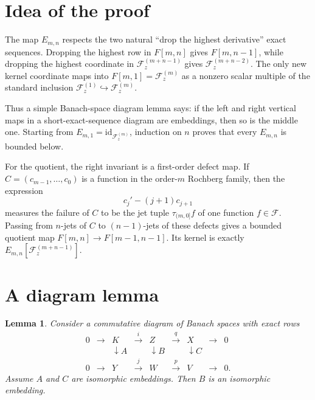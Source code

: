 \documentclass[11pt]{article}
\newtheorem{lemma}{Lemma}
\newcommand{\F}{\mathscr F}
\newcommand{\To}{\longrightarrow}
\begin{document}
\section*{Idea of the proof}

The map \(E_{m,n}\) respects the two natural ``drop the highest derivative'' exact sequences.  Dropping the highest row in \(F[m,n]\) gives \(F[m,n-1]\), while dropping the highest coordinate in \(\F_z^{(m+n-1)}\) gives \(\F_z^{(m+n-2)}\).  The only new kernel coordinate maps into \(F[m,1]=\F_z^{(m)}\) as a nonzero scalar multiple of the standard inclusion \(\F_z^{(1)}\hookrightarrow \F_z^{(m)}\).

Thus a simple Banach-space diagram lemma says: if the left and right vertical maps in a short-exact-sequence diagram are embeddings, then so is the middle one.  Starting from \(E_{m,1}=\mathrm{id}_{\F_z^{(m)}}\), induction on \(n\) proves that every \(E_{m,n}\) is bounded below.

For the quotient, the right invariant is a first-order defect map.  If \(C=(c_{m-1},\ldots,c_0)\) is a function in the order-\(m\) Rochberg family, then the expression
\[
  c_j'-(j+1)c_{j+1}
\]
measures the failure of \(C\) to be the jet tuple \(\tau_{(m,0]}f\) of one function \(f\in\F\).  Passing from \(n\)-jets of \(C\) to \((n-1)\)-jets of these defects gives a bounded quotient map \(F[m,n]\to F[m-1,n-1]\).  Its kernel is exactly \(E_{m,n}[\F_z^{(m+n-1)}]\).

\section*{A diagram lemma}

\begin{lemma}\label{lem:diagram}
Consider a commutative diagram of Banach spaces with exact rows
\[
\begin{array}{ccccccccc}
0&\To&K&\xrightarrow{i}&Z&\xrightarrow{q}&X&\To&0\\
 &&\downarrow A&&\downarrow B&&\downarrow C\\
0&\To&Y&\xrightarrow{j}&W&\xrightarrow{p}&V&\To&0 .
\end{array}
\]
Assume \(A\) and \(C\) are isomorphic embeddings.  Then \(B\) is an isomorphic embedding.
\end{lemma}
\end{document}
